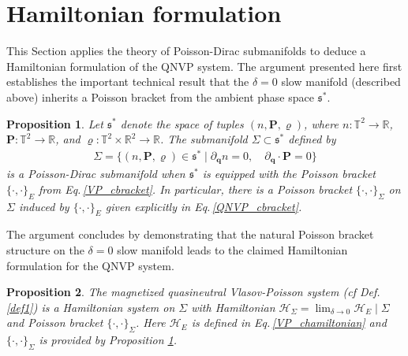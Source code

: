 \documentclass[%
 aip,
 amsmath,amssymb,
reprint, onecolumn %
]{revtex4-1}
\newtheorem{proposition}{Proposition}
\begin{document}
\section{Hamiltonian formulation\label{sec:ham_formulation}}
This Section applies the theory of Poisson-Dirac submanifolds\cite{crainic_integrability_2004} to deduce a Hamiltonian formulation of the QNVP system. The argument presented here first establishes the important technical result that the $\delta = 0$ slow manifold (described above) inherits a Poisson bracket from the ambient phase space $\mathfrak{s}^*$.
\begin{proposition}\label{PD_proposition}
Let $\mathfrak{s}^*$ denote the space of tuples $(n,\bm{P},\varrho)$, where $n:\mathbb{T}^2\rightarrow\mathbb{R}$, $\bm{P}:\mathbb{T}^2\rightarrow\mathbb{R}$, and $\varrho:\mathbb{T}^2\times\mathbb{R}^2\rightarrow\mathbb{R}$. The submanifold $\Sigma\subset\mathfrak{s}^*$ defined by 
\begin{align*}
\Sigma = \{(n,\bm{P},\varrho)\in\mathfrak{s}^*\mid \partial_{\bm{q}}n = 0,\quad \partial_{\bm{q}}\cdot\bm{P} = 0\}
\end{align*}
is a Poisson-Dirac submanifold when $\mathfrak{s}^*$ is equipped with the Poisson bracket $\{\cdot,\cdot\}_E$ from Eq.\,\eqref{VP_cbracket}. In particular, there is a Poisson bracket $\{\cdot,\cdot\}_\Sigma$ on $\Sigma$ induced by $\{\cdot,\cdot\}_E$ given explicitly in Eq.\,\eqref{QNVP_cbracket}.
\end{proposition}
\noindent The argument concludes by demonstrating that the natural Poisson bracket structure on the $\delta = 0$ slow manifold leads to the claimed Hamiltonian formulation for the QNVP system.
\begin{proposition}\label{hamiltonian_formulation_proposition}
The magnetized quasineutral Vlasov-Poisson system (cf Def. \ref{def1}) is a Hamiltonian system on $\Sigma$ with Hamiltonian $\mathcal{H}_\Sigma = \lim_{\delta\rightarrow 0}\mathcal{H}_{E}\mid \Sigma$ and Poisson bracket $\{\cdot,\cdot\}_\Sigma$. Here $\mathcal{H}_E$ is defined in Eq.\,\eqref{VP_chamiltonian} and $\{\cdot,\cdot\}_\Sigma$ is provided by Proposition \ref{PD_proposition}.
\end{proposition}
\end{document}
